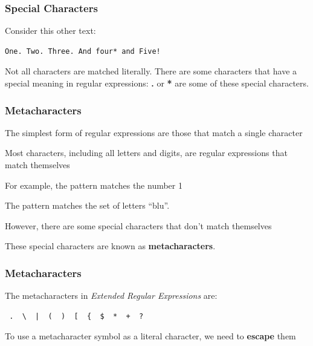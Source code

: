 \documentclass[12pt]{beamer}\usepackage[]{graphicx}\usepackage[]{color}
\begin{document}

\begin{frame}[fragile]
\frametitle{Special Characters}

Consider this other text:
\begin{verbatim}
One. Two. Three. And four* and Five!
\end{verbatim}

\bigskip

Not all characters are matched literally. There are some characters that have a special meaning in regular expressions: \textbf{.} or \textbf{*} are some of these special characters.

\end{frame}


\begin{frame}
\begin{center}
\Huge{}
\end{center}
\end{frame}


\begin{frame}
\frametitle{Metacharacters}

\bi
  \item The simplest form of regular expressions are those that match a single character 
  \item Most characters, including all letters and digits, are regular expressions that match themselves
  \item For example, the pattern  matches the number 1
  \item The pattern  matches the set of letters ``blu''.
  \item However, there are some special characters that don't match themselves
  \item These special characters are known as \textbf{metacharacters}.
\ei

\end{frame}


\begin{frame}[fragile]
\frametitle{Metacharacters}

The metacharacters in \textit{Extended Regular Expressions} are:
\begin{verbatim}
 .  \  |  (  )  [  {  $  *  +  ?
\end{verbatim}

\bigskip
To use a metacharacter symbol as a literal character, we need to \textbf{escape} them

\end{frame}
\end{document}
